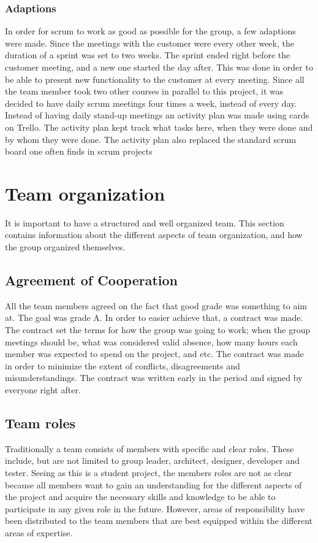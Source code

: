 \subsubsection{Adaptions}
In order for scrum to work as good as possible for the group, a few adaptions were made. Since the meetings with the customer were every other week, the duration of a sprint was set to two weeks. The sprint ended right before the customer meeting, and a new one started the day after. This was done in order to be able to present new functionality to the customer at every meeting. Since all the team member took two other courses in parallel to this project, it was decided to have daily scrum meetings four times a week, instead of every day. Instead of having daily stand-up meetings an activity plan was made using cards on Trello. The activity plan kept track what tasks here, when they were done and by whom they were done. The activity plan also replaced the standard scrum board one often finds in scrum projects 

\section{Team organization}
It is important to have a structured and well organized team. This section contains information about the different aspects of team organization, and how the group organized themselves.

\subsection{Agreement of Cooperation}
All the team members agreed on the fact that good grade was something to aim at. The goal was grade A. In order to easier achieve that, a contract was made. The contract set the terms for how the group was going to work; when the group meetings should be, what was considered valid absence, how many hours each member was expected to spend on the project, and etc. The contract was made in order to minimize the extent of conflicts, disagreements and misunderstandings. The contract was written early in the period and signed by everyone right after.

\subsection{Team roles}
Traditionally a team consists of members with specific and clear roles. These include, but are not limited to group leader, architect, designer, developer and tester. Seeing as this is a student project, the members roles are not as clear because all members want to gain an understanding for the different aspects of the project and acquire the necessary skills and knowledge to be able to participate in any given role in the future. However, areas of responsibility have been distributed to the team members that are best equipped within the different areas of expertise.

